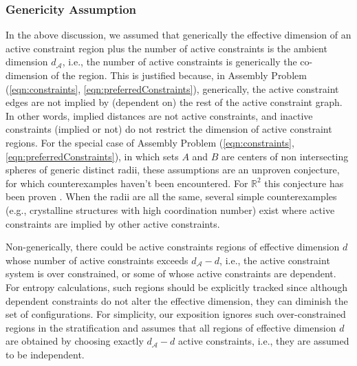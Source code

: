 \documentclass[]{article}
\newcommand{\ctwo}{\ref{eqn:preferredConstraints}}
\newcommand{\cone}{\ref{eqn:constraints}}
\begin{document}
\subsubsection{Genericity Assumption}
\label{sec:genericity}
In the above discussion, we assumed that 
generically the effective dimension of an active constraint region plus the
number of active constraints is the ambient dimension $d_\mathcal{A}$, i.e., the number of active
constraints is generically the co-dimension of the region. This is
justified because, in Assembly Problem (\cone, \ctwo), generically,
the active constraint edges are not implied by
(dependent on) the rest of the active constraint graph. 
In other words, implied distances are not active constraints, and
inactive constraints (implied or not) do not restrict the dimension of active constraint regions.
For the special case of Assembly Problem (\cone, \ctwo), in which sets $A$ and $B$ are
centers of non intersecting spheres of generic distinct radii, these
assumptions are an unproven conjecture, for which counterexamples haven't been
encountered. For $\mathbb{R}^2$ this conjecture has been proven \cite{connelly:2019:StickyDisks}.
When the radii are all the same, several simple counterexamples (e.g.,
crystalline structures with high coordination number) exist
where active constraints are implied by other active constraints. 

Non-generically, there could be active constraints regions of effective
dimension $d$ whose number of active constraints exceeds $d_\mathcal{A} - d $,
i.e., the active constraint system is over constrained, or some of whose active
constraints are dependent. For entropy calculations, such regions should be
explicitly tracked since although dependent constraints do not alter the
effective dimension, they can diminish the set of configurations. For
simplicity, our exposition ignores such over-constrained regions in the
stratification and assumes that all regions of effective dimension $d$ are
obtained by choosing exactly $d_\mathcal{A} - d $ active constraints, i.e.,
they are assumed to be independent.
\end{document}
